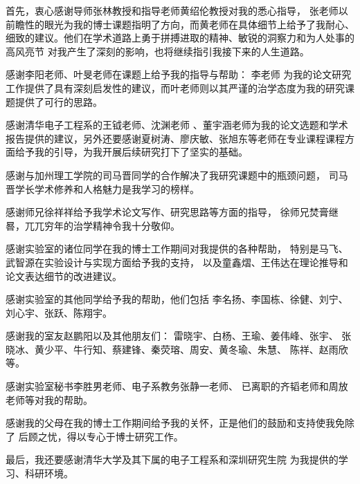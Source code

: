 
\begin{acknowledgements}
  首先，衷心感谢导师张林教授和指导老师黄绍伦教授对我的悉心指导，
  张老师以前瞻性的眼光为我的博士课题指明了方向，而黄老师在具体细节上给予了我耐心、
  细致的建议。他们在学术道路上勇于拼搏进取的精神、敏锐的洞察力和为人处事的高风亮节
  对我产生了深刻的影响，也将继续指引我接下来的人生道路。

  感谢李阳老师、叶旻老师在课题上给予我的指导与帮助：
  李老师 为我的论文研究工作提供了具有深刻启发性的建议，而叶老师则以其严谨的治学态度为我的研究课题提供了可行的思路。

 感谢清华电子工程系的王钺老师、沈渊老师 、董宇涵老师为我的论文选题和学术报告提供的建议，另外还要感谢夏树涛、廖庆敏、张旭东等老师在专业课程课程方面给予我的引导，为我开展后续研究打下了坚实的基础。
 
 感谢与加州理工学院的司马晋同学的合作解决了我研究课题中的瓶颈问题，
 司马晋学长学术修养和人格魅力是我学习的榜样。
 
 感谢师兄徐祥祥给予我学术论文写作、研究思路等方面的指导，
 徐师兄焚膏继晷，兀兀穷年的治学精神令我十分敬仰。
 
感谢实验室的诸位同学在我的博士工作期间对我提供的各种帮助，
特别是马飞、武智源在实验设计与实现方面给予我的支持，
以及童鑫熠、王伟达在理论推导和论文表达细节的改进建议。

感谢实验室的其他同学给予我的帮助，他们包括
李名扬、李国栋、徐健、刘宁、刘心宇、张跃、陈翔宇。

感谢我的室友赵鹏阳以及其他朋友们：
雷晓宇、白杨、王瑜、姜伟峰、张宇、
张晓冰、黄少平、牛行知、蔡建锋、秦荧瑢、周安、黄冬瑜、朱慧、
陈祥、赵雨欣等。

感谢实验室秘书李胜男老师、电子系教务张静一老师、
已离职的齐韬老师和周放老师等对我的帮助。

感谢我的父母在我的博士工作期间给予我的关怀，正是他们的鼓励和支持使我免除了
后顾之忧，得以专心于博士研究工作。

最后，我还要感谢清华大学及其下属的电子工程系和深圳研究生院
为我提供的学习、科研环境。
\end{acknowledgements}
